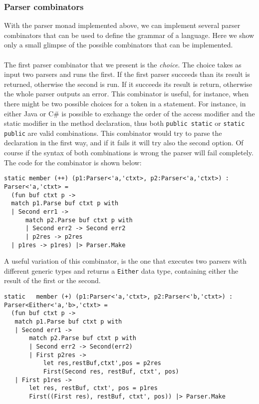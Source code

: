 \subsubsection{Parser combinators}
With the parser monad implemented above, we can implement several parser combinators that can be used to define the grammar of a language. Here we show only a small glimpse of the possible combinators that can be implemented.\\\\
The first parser combinator that we present is the \textit{choice}. The choice takes as input two parsers and runs the first. If the first parser succeeds than its result is returned, otherwise the second is run. If it succeeds its result is return, otherwise the whole parser outputs an error. This combinator is useful, for instance, when there might be two possible choices for a token in a statement. For instance, in either Java or C\# is possible to exchange the order of the access modifier and the static modifier in the method declaration, thus both \texttt{public static} or \texttt{static public} are valid combinations. This combinator would try to parse the declaration in the first way, and if it fails it will try also the second option. Of course if the syntax of both combinations is wrong the parser will fail completely. The code for the combinator is shown below:

\begin{lstlisting}
static member (++) (p1:Parser<'a,'ctxt>, p2:Parser<'a,'ctxt>) : Parser<'a,'ctxt> = 
  (fun buf ctxt p ->
  match p1.Parse buf ctxt p with
  | Second err1 ->
      match p2.Parse buf ctxt p with
      | Second err2 -> Second err2
      | p2res -> p2res
  | p1res -> p1res) |> Parser.Make
\end{lstlisting}

\noindent
A useful variation of this combinator, is the one that executes two parsers with different generic types and returns a \texttt{Either} data type, containing either the result of the first or the second.
\begin{lstlisting}
static   member (+) (p1:Parser<'a,'ctxt>, p2:Parser<'b,'ctxt>) : Parser<Either<'a,'b>,'ctxt> = 
  (fun buf ctxt p ->
   match p1.Parse buf ctxt p with
   | Second err1 ->
       match p2.Parse buf ctxt p with
       | Second err2 -> Second(err2)
       | First p2res -> 
           let res,restBuf,ctxt',pos = p2res 
           First(Second res, restBuf, ctxt', pos)
   | First p1res ->
       let res, restBuf, ctxt', pos = p1res
       First((First res), restBuf, ctxt', pos)) |> Parser.Make
\end{lstlisting}


